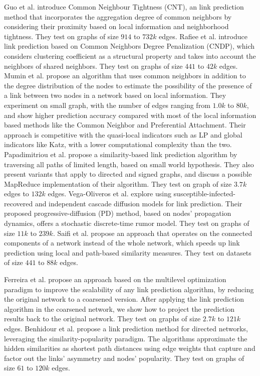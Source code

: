 Guo et al. \cite{guo2019node} introduce Common Neighbour Tightness (CNT), an link prediction method that incorporates the aggregation degree of common neighbors by considering their proximity based on local information and neighborhood tightness. They test on graphs of size $914$ to $732k$ edges.
Rafiee et al. \cite{rafiee2020cndp} introduce link prediction based on Common Neighbors Degree Penalization (CNDP), which considers clustering coefficient as a structural property and takes into account the neighbors of shared neighbors. They test on graphs of size $441$ to $42k$ edges.
Mumin et al. \cite{mumin2022efficient} propose an algorithm that uses common neighbors in addition to the degree distribution of the nodes to estimate the possibility of the presence of a link between two nodes in a network based on local information. They experiment on small graph, with the number of edges ranging from $1.0k$ to $80k$, and show higher prediction accuracy compared with most of the local information based methods like the Common Neighbor and Preferential Attachment. Their approach is competitive with the quasi-local indicators such as LP and global indicators like Katz, with a lower computational complexity than the two.
Papadimitriou et al. \cite{papadimitriou2012fast} propose a similarity-based link prediction algorithm by traversing all paths of limited length, based on small world hypothesis. They also present variants that apply to directed and signed graphs, and discuss a possible MapReduce implementation of their algorithm. They test on graph of size $3.7k$ edges to $132k$ edges.
Vega-Oliveros et al. \cite{vega2021link} explore using susceptible-infected-recovered and independent cascade diffusion models for link prediction. Their proposed progressive-diffusion (PD) method, based on nodes' propagation dynamics, offers a stochastic discrete-time rumor model. They test on graphs of size $11k$ to $239k$.
Saifi et al. \cite{saifi2023fast} propose an approach that operates on the connected components of a network instead of the whole network, which speeds up link prediction using local and path-based similarity measures. They test on datasets of size $441$ to $88k$ edges.

Ferreira et al. \cite{ferreira2019scalability} propose an approach based on the multilevel optimization paradigm to improve the scalability of any link prediction algorithm, by reducing the original network to a coarsened version. After applying the link prediction algorithm in the coarsened network, we show how to project the prediction results back to the original network. They test on graphs of size $2.7k$ to $121k$ edges.
Benhidour et al. \cite{benhidour2022approach} propose a link prediction method for directed networks, leveraging the similarity-popularity paradigm. The algorithms approximate the hidden similarities as shortest path distances using edge weights that capture and factor out the links' asymmetry and nodes' popularity. They test on graphs of size $61$ to $120k$ edges.

